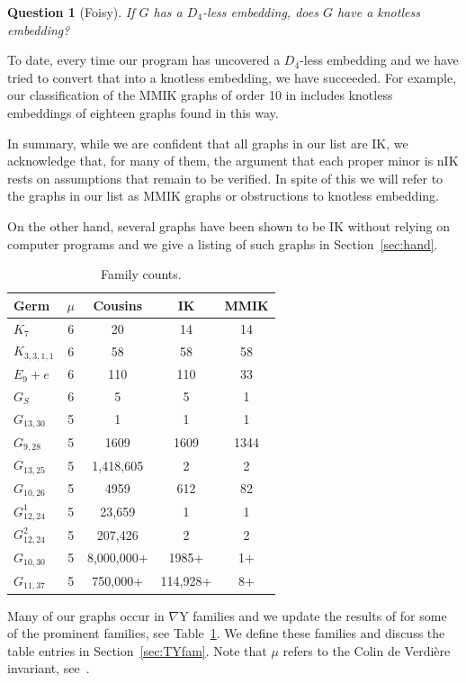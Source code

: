 \documentclass{amsart}
\newtheorem{question}[theorem]{Question}
\theoremstyle{remark}
\newcommand{\ty}{\nabla\mathrm{Y}}
\begin{document}
{\begin{question}[Foisy]
\label{que:ID4}
If $G$ has a $D_4$-less embedding, does $G$ have a knotless embedding? \end{question}

To date, every time our program has uncovered a $D_4$-less embedding and we have tried to convert that into a knotless embedding, 
we have succeeded. For example, our classification of the MMIK graphs of order 10 in \cite{KM} includes knotless embeddings of 
eighteen graphs found in this way.

In summary, while we are confident that all graphs in our list are IK, we acknowledge that, for many of them, the argument that each proper minor is nIK 
rests on assumptions that remain to be verified. In spite of this we will refer to the graphs in our list as MMIK graphs or obstructions to 
knotless embedding.

On the other hand, several graphs have been shown to be IK without relying on computer programs and we give a listing of such graphs in
Section~\ref{sec:hand}.


\begin{table}[ht]
\begin{center}
\begin{tabular}{|l|c|c|c|c|} \hline
Germ & $\mu$ & Cousins & IK  & MMIK  \\ \hline
$K_7$ & 6 &  20 & 14 & 14 \\ \hline
$K_{3,3,1,1}$ & 6 & 58 & 58 & 58 \\ \hline
$E_9+e$ & 6 & 110 & 110 & 33 \\ \hline
$G_S$ & 6 & 5 & 5 & 1 \\ \hline
$G_{13,30}$ & 5 & 1 & 1 & 1 \\ \hline
$G_{9,28}$ & 5 & 1609 & 1609 &  1344 \\ \hline
$G_{13,25}$ & 5 & 1,418,605 &  2 & 2 \\ \hline
$G_{10,26}$ & 5 & 4959 &  612 & 82 \\ \hline
$G^1_{12,24}$ & 5 & 23,659 & 1 & 1 \\ \hline
$G^2_{12,24}$ & 5 & 207,426 & 2 & 2 \\ \hline
$G_{10,30}$ & 5 & 8,000,000+ & 1985+ & 1+ \\ \hline
$G_{11,37}$ & 5 & 750,000+ & 114,928+ & 8+ \\ \hline
\end{tabular}
\vspace*{.1in}
\caption{Family counts.} \label{tbl:results}
\end{center}
\end{table}
Many of our graphs occur in $\ty$ families and we update the results of \cite{GMN} for some of the prominent families, see Table~\ref{tbl:results}.
We define these families and discuss the  table entries in Section~\ref{sec:TYfam}. Note that $\mu$ refers to the Colin de Verdi\`ere invariant, 
see~\cite{CdV}.

}
\end{document}
